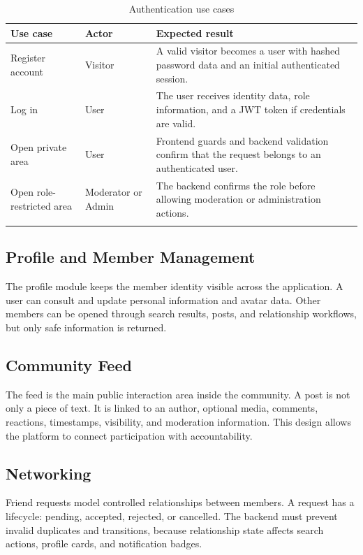 \begin{longtable}{|m{3.2cm}|m{2.8cm}|m{7.7cm}|}
\hline
\textbf{Use case} & \textbf{Actor} & \textbf{Expected result} \\
\hline
Register account & Visitor & A valid visitor becomes a user with hashed password data and an initial authenticated session. \\
\hline
Log in & User & The user receives identity data, role information, and a JWT token if credentials are valid. \\
\hline
Open private area & User & Frontend guards and backend validation confirm that the request belongs to an authenticated user. \\
\hline
Open role-restricted area & Moderator or Admin & The backend confirms the role before allowing moderation or administration actions. \\
\hline
\caption{Authentication use cases}
\end{longtable}

\subsection{Profile and Member Management}

The profile module keeps the member identity visible across the application. A user can consult and update personal information and avatar data. Other members can be opened through search results, posts, and relationship workflows, but only safe information is returned.

\subsection{Community Feed}

The feed is the main public interaction area inside the community. A post is not only a piece of text. It is linked to an author, optional media, comments, reactions, timestamps, visibility, and moderation information. This design allows the platform to connect participation with accountability.

\subsection{Networking}

Friend requests model controlled relationships between members. A request has a lifecycle: pending, accepted, rejected, or cancelled. The backend must prevent invalid duplicates and transitions, because relationship state affects search actions, profile cards, and notification badges.

